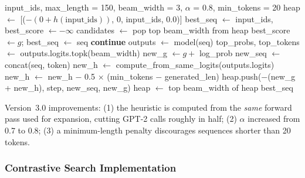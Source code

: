 \documentclass[12pt]{article}
\begin{document}
	\begin{algorithm}[H]
		\caption{Improved A$^*$ Search (Version 3.0)}
		\label{alg:astar}
		\begin{algorithmic}[1]
			\Require input\_ids, max\_length = 150, beam\_width = 3, $\alpha$ = 0.8, min\_tokens = 20
			\State heap $\leftarrow$ [($-(0 + h(\text{input\_ids}))$, 0, input\_ids, 0.0)]
			\State best\_seq $\leftarrow$ input\_ids, best\_score $\leftarrow -\infty$
			\State candidates $\leftarrow$ pop top beam\_width from heap
			 best\_score $\leftarrow g$; best\_seq $\leftarrow$ seq \EndIf
			\State \textbf{continue}
			\EndIf
			\State outputs $\leftarrow$ model(seq) 
			\State top\_probs, top\_tokens $\leftarrow$ outputs.logits.topk(beam\_width)
			\State new\_g $\leftarrow g + $ log\_prob
			\State new\_seq $\leftarrow$ concat(seq, token)
			\State new\_h $\leftarrow$ compute\_from\_same\_logits(outputs.logits) 
			\State new\_h $\leftarrow$ new\_h $-$ 0.5 $\times$ (min\_tokens $-$ generated\_len) 
			\EndIf
			\State heap.push($-$(new\_g + new\_h), step, new\_seq, new\_g)
			\EndFor
			\EndFor
			\State heap $\leftarrow$ top beam\_width of heap 
			\EndFor
			\Return best\_seq
		\end{algorithmic}
	\end{algorithm}
	
	Version~3.0 improvements: (1) the heuristic is computed from the \emph{same} forward pass used for expansion, cutting GPT-2 calls roughly in half; (2) $\alpha$ increased from 0.7 to 0.8; (3) a minimum-length penalty discourages sequences shorter than 20 tokens.
	
	\subsubsection{Contrastive Search Implementation}
	
\end{document}
